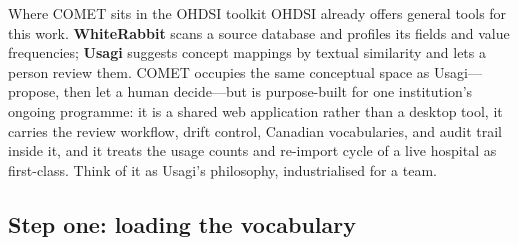 \documentclass[12pt,openany]{book}
\begin{document}
\begin{center}
\end{center}

\begin{practice}{Where COMET sits in the OHDSI toolkit}
OHDSI already offers general tools for this work. \textbf{WhiteRabbit} scans a source database and
profiles its fields and value frequencies; \textbf{Usagi} suggests concept mappings by textual
similarity and lets a person review them. COMET occupies the same conceptual space as Usagi---
propose, then let a human decide---but is purpose-built for one institution's ongoing programme: it is
a shared web application rather than a desktop tool, it carries the review workflow, drift control,
Canadian vocabularies, and audit trail inside it, and it treats the usage counts and re-import cycle of
a live hospital as first-class. Think of it as Usagi's philosophy, industrialised for a team.
\end{practice}

\subsection{Step one: loading the vocabulary}
\end{document}
